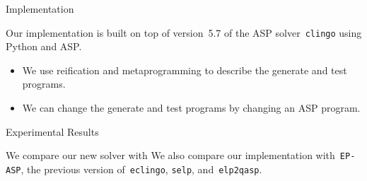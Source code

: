 \documentclass[aspectratio=169,svgnames,xcolor=table,t]{beamer}
\begin{document}
\begin{frame}{Implementation}
    \begin{myitemize}
        \item Our implementation is built on top of version~5.7 of the ASP solver~\texttt{clingo} using Python and ASP.
        \begin{itemize}
            \item We use reification and metaprogramming to describe the generate and test programs.
            \item We can change the generate and test programs by changing an ASP program.
        \end{itemize}
    \end{myitemize}
\end{frame}
\begin{frame}{Experimental Results}
    \begin{myitemize}
        \item We compare our new solver with We also compare our implementation with~\texttt{EP-ASP},
        the previous version of~\texttt{eclingo},
        \texttt{selp}, and~\texttt{elp2qasp}.
    \end{myitemize}
\end{frame}

\frame{\backcoverpage}
\end{document}
